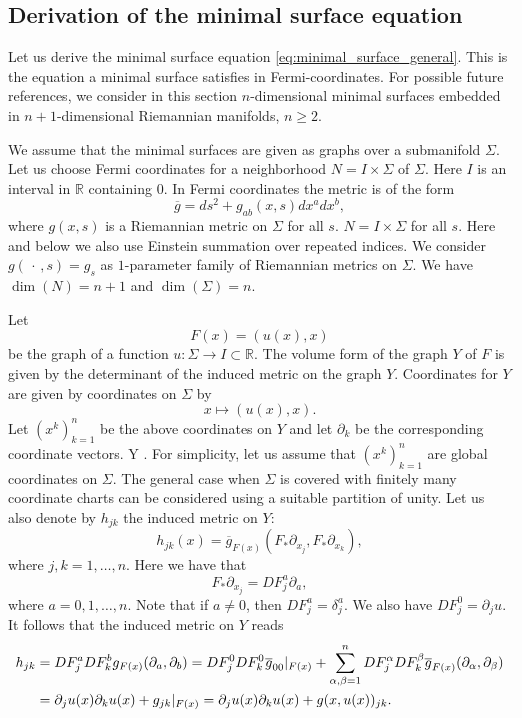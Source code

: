 \documentclass[12pt]{amsart}
\def\p{\partial}
\def\R{\mathbb R}
\theoremstyle{definition}
\theoremstyle{remark}
\newcommand{\s}{\hspace{0.5pt}}
\newcommand{\ccdot}{\,\cdot\,}
\begin{document}
\subsection{Derivation of the minimal surface equation}
Let us derive the minimal surface equation \eqref{eq:minimal_surface_general}. This is the equation a minimal surface satisfies in Fermi-coordinates. For possible future references, we consider in this section $n$-dimensional minimal surfaces embedded in $n+1$-dimensional Riemannian manifolds, $n\geq 2$.

We assume that the minimal surfaces are given as graphs over a submanifold $\Sigma$. Let us choose Fermi coordinates for a neighborhood $N=I\times \Sigma$ of $\Sigma$. Here $I$ is an interval in $\R$ containing $0$.  In Fermi coordinates the metric is of the form
\begin{equation*}%
 \overline g=ds^2 +g_{ab}(x,s)dx^adx^b,
\end{equation*}
where $g(x,s)$ is a Riemannian metric on $\Sigma$ for all $s$.  $N=I\times \Sigma$ for all $s$. Here and below we also use Einstein summation over repeated indices.   We consider $g(\ccdot,s)=g_s$ as $1$-parameter family of Riemannian metrics on $\Sigma$. We have $\dim(N)=n+1$ and $\dim(\Sigma)=n$. 


Let 
\[
 F(x)=(u(x),x)
\]
be the graph of a function $u:\Sigma\to I\subset \R$. The volume form of the graph $Y$ of $F$ is given by the determinant of the induced metric on the graph $Y$. Coordinates for $Y$ are given by coordinates on $\Sigma$ by
\[
 x\mapsto (u(x),x).
\]
Let $(x^k)_{k=1}^n$ be the above coordinates on $Y$ and let $\p_k$ be the corresponding coordinate vectors. Y .
For simplicity, let us assume that $(x^k)_{k=1}^n$ are global coordinates on $\Sigma$. The general case when
$\Sigma$ is covered with finitely many coordinate charts can be considered using a suitable partition
of unity. Let us also denote by $h_{jk}$ the induced metric on $Y$:    
\[
 h_{jk}(x)=\overline g_{F(x)}(F_*\p_{x_j},F_*\p_{x_k}),
\]
where $j,k=1,\ldots, n$. Here we have that 
\[
 F_*\p_{x_j}=DF_j^a\p_a,
\]
where $a=0,1,\ldots, n$. Note that if $a\neq 0$, then $DF_j^a=\delta_j^a$. We also have $DF_j^0=\p_ju$. It follows that the induced metric on $Y$ reads
\begin{align*}
 h_{jk}&=DF_j^aDF_k^b g_{F(x)}(\p_a,\p_b)=DF_j^0DF_k^0 \s\overline g_{00}|_{F(x)}+\sum_{\alpha,\beta=1}^nDF_j^\alpha DF_k^\beta \overline g_{F(x)}(\p_\alpha,\p_\beta) \\
 &=\p_ju(x)\p_ku(x)+g_{jk}|_{F(x)}=\p_ju(x)\p_ku(x)+g(x,u(x))_{jk}.
\end{align*}
\end{document}
